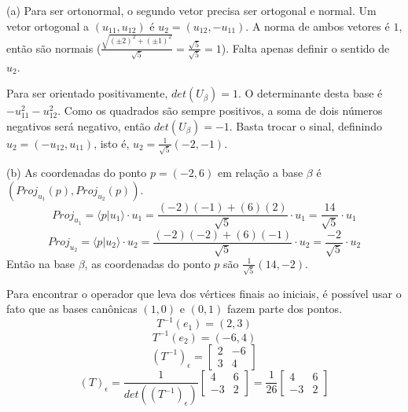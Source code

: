 \documentclass{homework}
\begin{document}
\exercise*
(a) Para ser ortonormal, o segundo vetor precisa ser ortogonal e normal. Um vetor ortogonal a $(u_{11},u_{12})$ é $u_2 = (u_{12},-u_{11})$. A norma de ambos vetores é $1$, então são normais ($\frac{\sqrt{(\pm2)^2 + (\pm1)^2}}{\sqrt{5}} = \frac{\sqrt{5}}{\sqrt{5}} = 1$). Falta apenas definir o sentido de $u_2$. 

Para ser orientado positivamente, $det(U_\beta) = 1$. O determinante desta base é $-u_{11}^2 - u_{12}^2$. Como os quadrados são sempre positivos, a soma de dois números negativos será negativo, então $det(U_\beta) = -1$. Basta trocar o sinal, definindo $u_2 = (-u_{12},u_{11})$, isto é, $u_2 = \frac{1}{\sqrt{5}}(-2,-1)$.

(b) As coordenadas do ponto $p = (-2,6)$ 
em relação a base $\beta$ é $(Proj_{u_1}(p),Proj_{u_2}(p))$.
\[Proj_{u_1} = \langle p|u_1\rangle\cdot u_1 = \frac{(-2)(-1) + (6)(2)}{\sqrt{5}} \cdot u_1 = \frac{14}{\sqrt{5}} \cdot u_1\]
\[Proj_{u_2} = \langle p|u_2\rangle\cdot u_2 = \frac{(-2)(-2) + (6)(-1)}{\sqrt{5}} \cdot u_2 = \frac{-2}{\sqrt{5}} \cdot u_2\]
Então na base $\beta$, as coordenadas do ponto $p$ são $\frac{1}{\sqrt{5}}(14,-2)$.

\exercise*
Para encontrar o operador que leva dos vértices finais ao iniciais, é possível usar o fato que as bases canônicas $(1,0)$ e $(0,1)$ fazem parte dos pontos. 
\[T^{-1}(e_1) = (2,3)\]
\[T^{-1}(e_2) = (-6,4)\]
\[(T^{-1})_\epsilon = 
\begin{bmatrix}
2 & -6\\
3 & 4
\end{bmatrix}\]
\[\]
\[(T)_\epsilon = \frac{1}{det((T^{-1})_\epsilon)}
\begin{bmatrix}
4 & 6\\
-3 & 2
\end{bmatrix} = \frac{1}{26}
\begin{bmatrix}
4 & 6\\
-3 & 2
\end{bmatrix}\]
\end{document}
